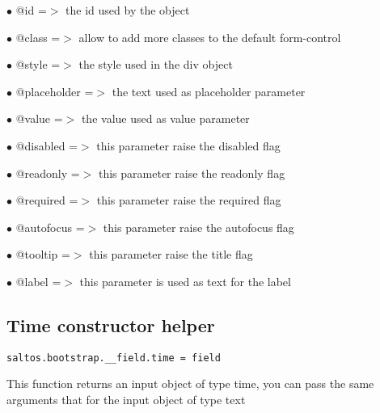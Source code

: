 \documentclass[a4paper]{book}
\begin{document}
\begin{compactitem}
\item[\color{myblue}$\bullet$] @id          =$>$ the id used by the object
\item[\color{myblue}$\bullet$] @class       =$>$ allow to add more classes to the default form-control
\item[\color{myblue}$\bullet$] @style       =$>$ the style used in the div object
\item[\color{myblue}$\bullet$] @placeholder =$>$ the text used as placeholder parameter
\item[\color{myblue}$\bullet$] @value       =$>$ the value used as value parameter
\item[\color{myblue}$\bullet$] @disabled    =$>$ this parameter raise the disabled flag
\item[\color{myblue}$\bullet$] @readonly    =$>$ this parameter raise the readonly flag
\item[\color{myblue}$\bullet$] @required    =$>$ this parameter raise the required flag
\item[\color{myblue}$\bullet$] @autofocus   =$>$ this parameter raise the autofocus flag
\item[\color{myblue}$\bullet$] @tooltip     =$>$ this parameter raise the title flag
\item[\color{myblue}$\bullet$] @label       =$>$ this parameter is used as text for the label
\end{compactitem}

\hypertarget{toc441}{}
\subsection{Time constructor helper}

\begin{lstlisting}
saltos.bootstrap.__field.time = field
\end{lstlisting}

This function returns an input object of type time, you can pass the same arguments
that for the input object of type text
\end{document}
